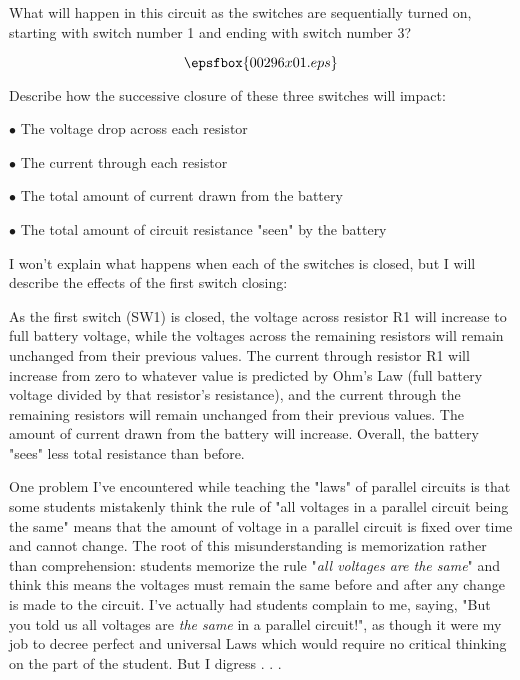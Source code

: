 

What will happen in this circuit as the switches are sequentially turned on, starting with switch number 1 and ending with switch number 3?  

$$\epsfbox{00296x01.eps}$$

Describe how the successive closure of these three switches will impact:

\medskip
\item{$\bullet$} The voltage drop across each resistor 
\item{$\bullet$} The current through each resistor
\item{$\bullet$} The total amount of current drawn from the battery
\item{$\bullet$} The total amount of circuit resistance "seen" by the battery
\medskip







I won't explain what happens when each of the switches is closed, but I will describe the effects of the first switch closing:

As the first switch (SW1) is closed, the voltage across resistor R1 will increase to full battery voltage, while the voltages across the remaining resistors will remain unchanged from their previous values.  The current through resistor R1 will increase from zero to whatever value is predicted by Ohm's Law (full battery voltage divided by that resistor's resistance), and the current through the remaining resistors will remain unchanged from their previous values.  The amount of current drawn from the battery will increase.  Overall, the battery "sees" less total resistance than before.







One problem I've encountered while teaching the "laws" of parallel circuits is that some students mistakenly think the rule of "all voltages in a parallel circuit being the same" means that the amount of voltage in a parallel circuit is fixed over time and cannot change.  The root of this misunderstanding is memorization rather than comprehension: students memorize the rule "{\it all voltages are the same}" and think this means the voltages must remain the same before and after any change is made to the circuit.  I've actually had students complain to me, saying, "But you told us all voltages are {\it the same} in a parallel circuit!", as though it were my job to decree perfect and universal Laws which would require no critical thinking on the part of the student.  But I digress . . .

